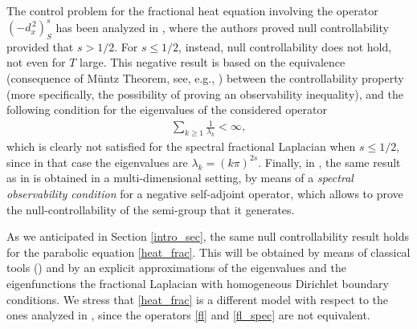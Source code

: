 The control problem for the fractional heat equation involving the operator $(-d_x^{\,2})^s_S$ has been analyzed in \cite{micu2006controllability}, where the authors proved null controllability provided that $s>1/2$. For $s\leq 1/2$, instead, null controllability does not hold, not even for $T$ large. This negative result is based on the equivalence (consequence of M\"untz Theorem, see, e.g., \cite[Page 24]{schwartz1958etude}) between the controllability property (more specifically, the possibility of proving an observability inequality), and the following condition for the eigenvalues of the considered operator 
\begin{align}\label{eigen_cond}
	\sum_{k\geq 1} \frac{1}{\lambda_k}<\infty,
\end{align} 
which is clearly not satisfied for the spectral fractional Laplacian when $s\leq 1/2$, since in that case the eigenvalues are $\lambda_k = (k\pi)^{2s}$. Finally, in \cite{miller2006controllability}, the same result as in \cite{micu2006controllability} is obtained in a multi-dimensional setting, by means of a  \textit{spectral observability condition} for a negative self-adjoint operator, which allows to prove the null-controllability of the semi-group that it generates.

As we anticipated in Section \ref{intro_sec}, the same null controllability result holds for the parabolic equation \eqref{heat_frac}.
This will be obtained by means of classical tools (\cite{fattorini1971exact}) and by an explicit approximations of the eigenvalues and the eigenfunctions the fractional Laplacian with homogeneous Dirichlet boundary conditions. We stress that \eqref{heat_frac} is a different model with respect to the ones analyzed in \cite{micu2004introduction,miller2006controllability}, since the operators \eqref{fl} and \eqref{fl_spec} are not equivalent. 
